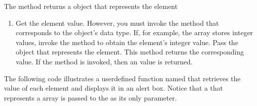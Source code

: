 \documentclass[letterpaper,12pt,english,openany,oneside]{sphinxmanual}
\begin{document}
The  method returns a  object that represents the element
\begin{enumerate}
%
\item {} 
Get the element value. However, you must invoke the method that corresponds to the  object’s data type. If, for example, the  array stores integer values, invoke the  method to obtain the element’s integer value. Pass the  object that represents the element. This method returns the corresponding value. If the  method is invoked, then an  value is returned.

\end{enumerate}

The following code illustrates a user\sphinxhyphen{}defined function named  that retrieves the value of each element and displays it in an alert box. Notice that a  that represents a  array is passed to the  as its only parameter.
\end{document}
